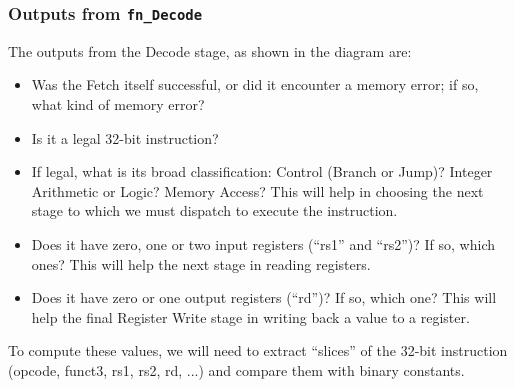 \begin{frame}
\frametitle{Outputs from {\tt fn\_Decode}}

\footnotesize

The outputs from the Decode stage, as shown in the diagram are:

\vspace{1ex}

\begin{itemize}

 \item Was the Fetch itself successful, or did it encounter a memory
   error; if so, what kind of memory error?

 \PAUSE{\vspace{1ex}}

 \item Is it a legal 32-bit instruction?

 \PAUSE{\vspace{1ex}}

 \item If legal, what is its broad classification: Control (Branch or
   Jump)? Integer Arithmetic or Logic? Memory Access?  This will help
   in choosing the next stage to which we must dispatch to execute the
   instruction.

 \PAUSE{\vspace{1ex}}

 \item Does it have zero, one or two input registers (``rs1'' and
   ``rs2'')?  If so, which ones?  This will help the next stage in
   reading registers.

 \PAUSE{\vspace{1ex}}

 \item Does it have zero or one output registers (``rd'')?  If so,
   which one?  This will help the final Register Write stage in
   writing back a value to a register.

\end{itemize}

\PAUSE{\vspace{2ex}}

To compute these values, we will need to extract ``slices'' of the
32-bit instruction (opcode, funct3, rs1, rs2, rd, ...) and compare
them with binary constants.

\end{frame}


